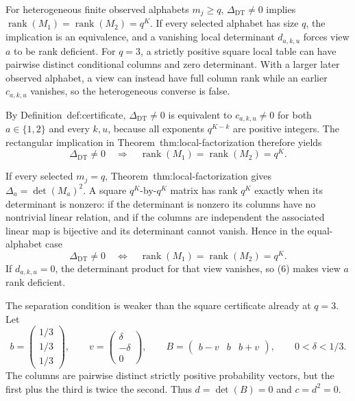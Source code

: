 For heterogeneous finite observed alphabets \(m_j\ge q\), \(\Delta_{\mathrm{DT}}\neq0\) implies \(\operatorname{rank}(M_1)=\operatorname{rank}(M_2)=q^K\).  If every selected alphabet has size \(q\), the implication is an equivalence, and a vanishing local determinant \(d_{a,k,u}\) forces view \(a\) to be rank deficient.  For \(q=3\), a strictly positive square local table can have pairwise distinct conditional columns and zero determinant.  With a larger later observed alphabet, a view can instead have full column rank while an earlier \(c_{a,k,u}\) vanishes, so the heterogeneous converse is false.

By Definition~\textnormal{def:certificate}, \(\Delta_{\mathrm{DT}}\neq0\) is equivalent to \(c_{a,k,u}\neq0\) for both \(a\in\{1,2\}\) and every \(k,u\), because all exponents \(q^{K-k}\) are positive integers.  The rectangular implication in Theorem~\textnormal{thm:local-factorization} therefore yields
\[
 \Delta_{\mathrm{DT}}\neq0
 \quad\Longrightarrow\quad
 \operatorname{rank}(M_1)=\operatorname{rank}(M_2)=q^K.
\tag{5}
\]

If every selected \(m_j=q\), Theorem~\textnormal{thm:local-factorization} gives \(\Delta_a=\det(M_a)^2\).  A square \(q^K\)-by-\(q^K\) matrix has rank \(q^K\) exactly when its determinant is nonzero: if the determinant is nonzero its columns have no nontrivial linear relation, and if the columns are independent the associated linear map is bijective and its determinant cannot vanish.  Hence in the equal-alphabet case
\[
 \Delta_{\mathrm{DT}}\neq0
 \quad\Longleftrightarrow\quad
 \operatorname{rank}(M_1)=\operatorname{rank}(M_2)=q^K.
\tag{6}
\]
If \(d_{a,k,u}=0\), the determinant product for that view vanishes, so (6) makes view \(a\) rank deficient.

The separation condition is weaker than the square certificate already at \(q=3\).  Let
\[
 b=\begin{pmatrix}1/3\\1/3\\1/3\end{pmatrix},
 \qquad
 v=\begin{pmatrix}\delta\\-\delta\\0\end{pmatrix},
 \qquad
 B=\begin{pmatrix}b-v&b&b+v\end{pmatrix},
 \qquad 0<\delta<1/3.
\]
The columns are pairwise distinct strictly positive probability vectors, but the first plus the third is twice the second.  Thus \(d=\det(B)=0\) and \(c=d^2=0\).

